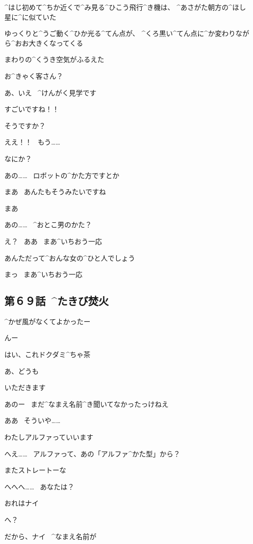 \page[38]
\Alpha ^{はじ}{初}めて^{ちか}{近}くで^{み}{見}る^{ひこう}{飛行}^{き}{機}は、
^{あさがた}{朝方}の^{ほし}{星}に^{に}{似}ていた

\Alpha ゆっくりと^{うご}{動}く^{ひか}{光}る^{てん}{点}が、
^{くろ}{黒}い^{てん}{点}に^{か}{変}わりながら^{おお}{大}きくなってくる

\page
\Alpha まわりの^{くうき}{空気}がふるえた

\page[42]
\Nai お^{きゃく}{客}さん？

\Alpha あ、いえ
\ ^{けんがく}{見学}です

\Alpha すごいですね！！

\Nai そうですか？

\Alpha ええ！！
\ もう……

\page
\Nai なにか？

\Alpha あの……
\ ロボットの^{かた}{方}ですとか

\Nai まあ
\ あんたもそうみたいですね

\Alpha まあ

\page
\Alpha あの……
\ ^{おとこ}{男}のかた？

\Nai え？
\ ああ
\ まあ^{いちおう}{一応}

\Nai あんただって^{おんな}{女}の^{ひと}{人}でしょう

\Alpha まっ
\ まあ^{いちおう}{一応}


\subsection{第６９話\ ^{たきび}{焚火}}

\page[46]
\Alpha ^{かぜ}{風}がなくてよかったー

\Nai んー

\Nai はい、これドクダミ^{ちゃ}{茶}

\Alpha あ、どうも

\Alpha いただきます

\page
\Alpha あのー
\ まだ^{なまえ}{名前}^{き}{聞}いてなかったっけねえ

\Nai ああ
\ そういや……

\Alpha わたしアルファっていいます

\Nai へえ……
\ アルファって、あの「アルファ^{かた}{型}」から？

\Nai またストレートーな

\Alpha へへへ……
\ あなたは？

\page
\Nai おれはナイ

\Alpha へ？

\Nai だから、ナイ
\ ^{なまえ}{名前}が

